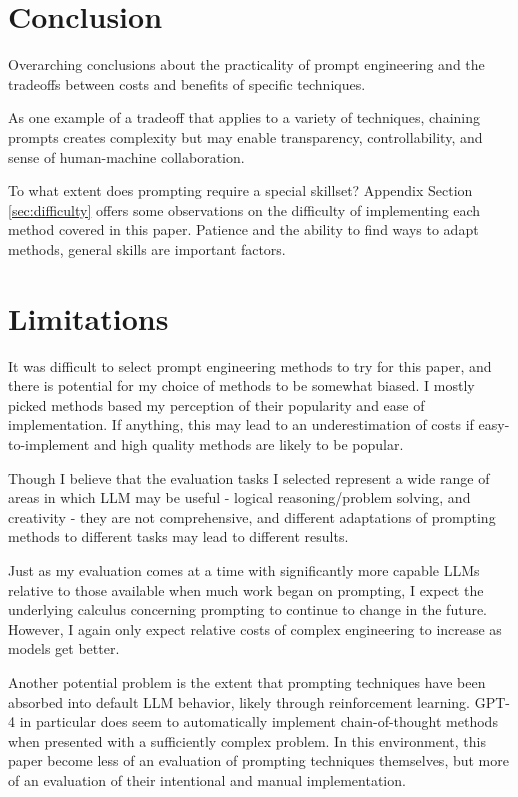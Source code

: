 \documentclass[11pt]{article}
\begin{document}
\section*{Conclusion}

Overarching conclusions about the practicality of prompt engineering and the tradeoffs between costs and benefits of specific techniques.

As one example of a tradeoff that applies to a variety of techniques, chaining prompts creates complexity but may enable transparency, controllability, and sense of human-machine collaboration. \cite{wu_ai_2022}

To what extent does prompting require a special skillset? Appendix Section \ref{sec:difficulty} offers some observations on the difficulty of implementing each method covered in this paper. Patience and the ability to find ways to adapt methods, general skills are important factors.

\section*{Limitations}

It was difficult to select prompt engineering methods to try for this paper, and there is potential for my choice of methods to be somewhat biased. I mostly picked methods based my perception of their popularity and ease of implementation. If anything, this may lead to an underestimation of costs if easy-to-implement and high quality methods are likely to be popular. 

Though I believe that the evaluation tasks I selected represent a wide range of areas in which LLM may be useful - logical reasoning/problem solving, and creativity - they are not comprehensive, and different adaptations of prompting methods to different tasks may lead to different results.

Just as my evaluation comes at a time with significantly more capable LLMs relative to those available when much work began on prompting, I expect the underlying calculus concerning prompting to continue to change in the future. However, I again only expect relative costs of complex engineering to increase as models get better.

Another potential problem is the extent that prompting techniques have been absorbed into default LLM behavior, likely through reinforcement learning. GPT-4 in particular does seem to automatically implement chain-of-thought methods when presented with a sufficiently complex problem. In this environment, this paper become less of an evaluation of prompting techniques themselves, but more of an evaluation of their intentional and manual implementation.
\end{document}
